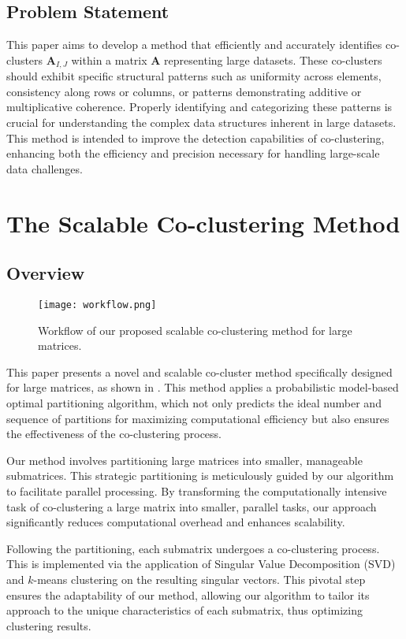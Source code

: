 \subsection{Problem Statement}
This paper aims to develop a method that efficiently and accurately identifies co-clusters $\mathbf{A}_{I, J}$ within a matrix $\mathbf{A}$ representing large datasets. These co-clusters should exhibit specific structural patterns such as uniformity across elements, consistency along rows or columns, or patterns demonstrating additive or multiplicative coherence. Properly identifying and categorizing these patterns is crucial for understanding the complex data structures inherent in large datasets. This method is intended to improve the detection capabilities of co-clustering, enhancing both the efficiency and precision necessary for handling large-scale data challenges.


\section{The Scalable Co-clustering Method}
\label{sec:method}
\subsection{Overview}

\begin{figure*}[htbp]
    \centering
    \texttt{[image: workflow.png]}
    \caption{Workflow of our proposed scalable co-clustering method for large matrices.}
    \label{fig:workflow}
\end{figure*}
This paper presents a novel and scalable co-cluster method specifically designed for large matrices, as shown in . This method applies a probabilistic model-based optimal partitioning algorithm, which not only predicts the ideal number and sequence of partitions for maximizing computational efficiency but also ensures the effectiveness of the co-clustering process.

Our method involves partitioning large matrices into smaller, manageable submatrices. This strategic partitioning is meticulously guided by our algorithm to facilitate parallel processing. By transforming the computationally intensive task of co-clustering a large matrix into smaller, parallel tasks, our approach significantly reduces computational overhead and enhances scalability.

Following the partitioning, each submatrix undergoes a co-clustering process. This is implemented via the application of Singular Value Decomposition (SVD) and $k$-means clustering on the resulting singular vectors. This pivotal step ensures the adaptability of our method, allowing our algorithm to tailor its approach to the unique characteristics of each submatrix, thus optimizing clustering results.

